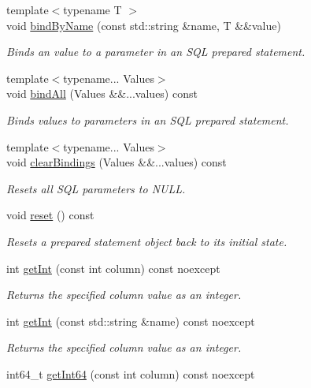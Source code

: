 \begin{DoxyCompactItemize}
{\footnotesize template$<$typename T $>$ }\\void \hyperlink{a00013_a30d8dec0baa340a358ce65a49ace23d8}{bind\-By\-Name} (const std\-::string \&name, T \&\&value)
\begin{DoxyCompactList}\small\item\em Binds an value to a parameter in an S\-Q\-L prepared statement. \end{DoxyCompactList}\item 
{\footnotesize template$<$typename... Values$>$ }\\void \hyperlink{a00013_a9b04cc93fd0242ea34d3e9e3a9cd88d3}{bind\-All} (Values \&\&...values) const 
\begin{DoxyCompactList}\small\item\em Binds values to parameters in an S\-Q\-L prepared statement. \end{DoxyCompactList}\item 
{\footnotesize template$<$typename... Values$>$ }\\void \hyperlink{a00013_a7139b0e838a43de61f03367a8631ee76}{clear\-Bindings} (Values \&\&...values) const 
\begin{DoxyCompactList}\small\item\em Resets all S\-Q\-L parameters to N\-U\-L\-L. \end{DoxyCompactList}\item 
void \hyperlink{a00013_a13a776f0e97da001cdcac81c13bff4c1}{reset} () const 
\begin{DoxyCompactList}\small\item\em Resets a prepared statement object back to its initial state. \end{DoxyCompactList}\item 
int \hyperlink{a00010_a82c5bc45048b8328a2fcc9bb4ff975f2}{get\-Int} (const int column) const noexcept
\begin{DoxyCompactList}\small\item\em Returns the specified column value as an integer. \end{DoxyCompactList}\item 
int \hyperlink{a00010_a87dd8234c2bd5f19466813f8a68ab80a}{get\-Int} (const std\-::string \&name) const noexcept
\begin{DoxyCompactList}\small\item\em Returns the specified column value as an integer. \end{DoxyCompactList}\item 
int64\-\_\-t \hyperlink{a00010_adb7b9705a4638d6d5af5ca26dfa474ff}{get\-Int64} (const int column) const noexcept

\end{DoxyCompactItemize}
